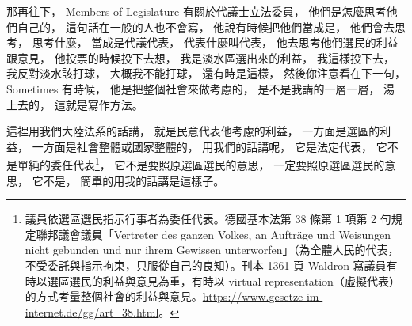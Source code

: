\hypertarget{w06:cue:1423}{}那再往下，
\hypertarget{w06:cue:1424}{}Members of Legislature
\hypertarget{w06:cue:1425}{}有關於代議士立法委員，
\hypertarget{w06:cue:1426}{}他們是怎麼思考他們自己的，
\hypertarget{w06:cue:1427}{}這句話在一般的人也不會寫，
\hypertarget{w06:cue:1428}{}他說有時候把他們當成是，
\hypertarget{w06:cue:1429}{}他們會去思考，
\hypertarget{w06:cue:1430}{}思考什麼，
\hypertarget{w06:cue:1431}{}當成是代議代表，
\hypertarget{w06:cue:1432}{}代表什麼叫代表，
\hypertarget{w06:cue:1433}{}他去思考他們選民的利益跟意見，
\hypertarget{w06:cue:1434}{}他投票的時候投下去想，
\hypertarget{w06:cue:1435}{}我是淡水區選出來的利益，
\hypertarget{w06:cue:1436}{}我這樣投下去，
\hypertarget{w06:cue:1437}{}我反對淡水該打球，
\hypertarget{w06:cue:1438}{}大概我不能打球，
\hypertarget{w06:cue:1439}{}還有時是這樣，
\hypertarget{w06:cue:1440}{}然後你注意看在下一句，
\hypertarget{w06:cue:1441}{}Sometimes 有時候，
\hypertarget{w06:cue:1442}{}他是把整個社會來做考慮的，
\hypertarget{w06:cue:1443}{}是不是我講的一層一層，
\hypertarget{w06:cue:1444}{}湯上去的，
\hypertarget{w06:cue:1445}{}這就是寫作方法。

\hypertarget{w06:cue:1446}{}這裡用我們大陸法系的話講，
\hypertarget{w06:cue:1447}{}就是民意代表他考慮的利益，
\hypertarget{w06:cue:1448}{}一方面是選區的利益，
\hypertarget{w06:cue:1449}{}一方面是社會整體或國家整體的，
\hypertarget{w06:cue:1450}{}用我們的話講呢，
\hypertarget{w06:cue:1451}{}它是法定代表，
\hypertarget{w06:cue:1452}{}它不是單純的委任代表\footnote{議員依選區選民指示行事者為委任代表。德國基本法第 38 條第 1 項第 2 句規定聯邦議會議員「Vertreter des ganzen Volkes, an Aufträge und Weisungen nicht gebunden und nur ihrem Gewissen unterworfen」（為全體人民的代表，不受委託與指示拘束，只服從自己的良知）。刊本 1361 頁 Waldron 寫議員有時以選區選民的利益與意見為重，有時以 virtual representation（虛擬代表）的方式考量整個社會的利益與意見。\url{https://www.gesetze-im-internet.de/gg/art_38.html}。}，
\hypertarget{w06:cue:1453}{}它不是要照原選區選民的意思，
\hypertarget{w06:cue:1454}{}一定要照原選區選民的意思，
\hypertarget{w06:cue:1455}{}它不是，
\hypertarget{w06:cue:1456}{}簡單的用我的話講是這樣子。

